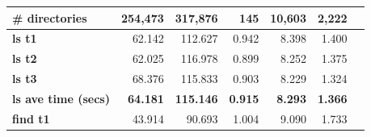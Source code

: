 \documentclass[12pt]{article}
\begin{document}
\begin{center}
\begin{tabular}{|l|r|r|r|r|r|l|}
    \textbf{\# directories}          & 254,473                           & 317,876                           & 145                                                                                      & 10,603                                                                                      & 2,222                                                                                         &                                    \\ \hline
    \textbf{ls t1}                   & 62.142                            & 112.627                           & 0.942                                                                                    & 8.398                                                                                       & 1.400                                                                                         &                                    \\ \hline
    \textbf{ls t2}                   & 62.025                            & 116.978                           & 0.899                                                                                    & 8.252                                                                                       & 1.375                                                                                         &                                    \\ \hline
    \textbf{ls t3}                   & 68.376                            & 115.833                           & 0.903                                                                                    & 8.229                                                                                       & 1.324                                                                                         &                                    \\ \hline
    \textbf{ls ave time (secs)}      & \textbf{64.181}                   & \textbf{115.146}                  & \textbf{0.915}                                                                           & \textbf{8.293}                                                                              & \textbf{1.366}                                                                                & \textbf{}                          \\ \hline
    \textbf{find t1}                 & 43.914                            & 90.693                            & 1.004                                                                                    & 9.090                                                                                       & 1.733                                                                                         &                                    \\ \hline

\end{tabular}
\end{center}
\end{document}
